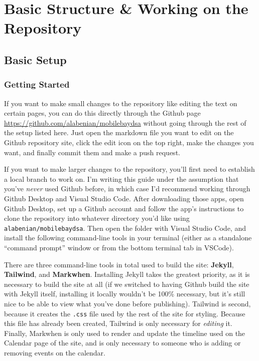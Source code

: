 \documentclass[
]{book}
\begin{document}
\part{Basic Structure \& Working on the Repository}\label{part-basic-structure-working-on-the-repository}

\chapter{Basic Setup}\label{basic-setup}

\section{Getting Started}\label{getting-started}

If you want to make small changes to the repository like editing the text on certain pages, you can do this directly through the Github page \url{https://github.com/alabenian/mobilebaydsa} without going through the rest of the setup listed here. Just open the markdown file you want to edit on the Github repository site, click the edit icon on the top right, make the changes you want, and finally commit them and make a push request.

If you want to make larger changes to the repository, you'll first need to establish a local branch to work on. I'm writing this guide under the assumption that you've \emph{never} used Github before, in which case I'd recommend working through Github Desktop and Visual Studio Code. After downloading those apps, open Github Desktop, set up a Github account and follow the app's instructions to clone the repository into whatever directory you'd like using \texttt{alabenian/mobilebaydsa}. Then open the folder with Visual Studio Code, and install the following command-line tools in your terminal (either as a standalone ``command prompt'' window or from the bottom terminal tab in VSCode).

There are three command-line tools in total used to build the site: \textbf{Jekyll}, \textbf{Tailwind}, and \textbf{Markwhen}. Installing Jekyll takes the greatest priority, as it is necessary to build the site at all (if we switched to having Github build the site with Jekyll itself, installing it locally wouldn't be 100\% necessary, but it's still nice to be able to view what you've done before publishing). Tailwind is second, because it creates the \texttt{.css} file used by the rest of the site for styling. Because this file has already been created, Tailwind is only necessary for \emph{editing} it. Finally, Markwhen is only used to render and update the timeline used on the Calendar page of the site, and is only necessary to someone who is adding or removing events on the calendar.
\end{document}
